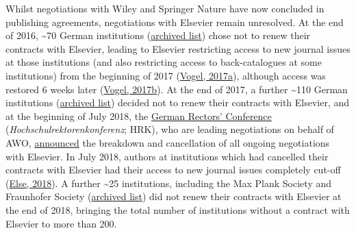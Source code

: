 \documentclass[
]{article}
\begin{document}
Whilst negotiations with Wiley and Springer Nature have now concluded in publishing agreements, negotiations with Elsevier remain unresolved. At the end of 2016, \textasciitilde70 German institutions (\href{https://web.archive.org/web/20191212094238/https://www.projekt-deal.de/vertragskuendigungen_elsevier/}{archived list}) chose not to renew their contracts with Elsevier, leading to Elsevier restricting access to new journal issues at those institutions (and also restricting access to back-catalogues at some institutions) from the beginning of 2017 (\href{https://doi.org/10.1126/science.355.6320.17}{Vogel, 2017a}), although access was restored 6 weeks later (\href{https://doi.org/10.1126/science.aal0753}{Vogel, 2017b}). At the end of 2017, a further \textasciitilde110 German institutions (\href{https://web.archive.org/web/20191212094842/https://www.projekt-deal.de/vertragskundigungen-elsevier-2017/}{archived list}) decided not to renew their contracts with Elsevier, and at the beginning of July 2018, the \href{https://www.hrk.de/}{German Rectors' Conference} (\emph{Hochschulrektorenkonferenz}; HRK), who are leading negotiations on behalf of AWO, \href{https://web.archive.org/web/20191212113744/https://www.hrk.de/presse/pressemitteilungen/pressemitteilung/meldung/verhandlungen-von-deal-und-elsevier-elsevier-forderungen-sind-fuer-die-wissenschaft-inakzeptabel-440/}{announced} the breakdown and cancellation of all ongoing negotiations with Elsevier. In July 2018, authors at institutions which had cancelled their contracts with Elsevier had their access to new journal issues completely cut-off (\href{https://doi.org/10.1038/d41586-018-05754-1}{Else, 2018}). A further \textasciitilde25 institutions, including the Max Plank Society and Fraunhofer Society (\href{https://web.archive.org/web/20191114074949/https://www.projekt-deal.de/vertragskundigungen-elsevier-2018/}{archived list}) did not renew their contracts with Elsevier at the end of 2018, bringing the total number of institutions without a contract with Elsevier to more than 200.
\end{document}
